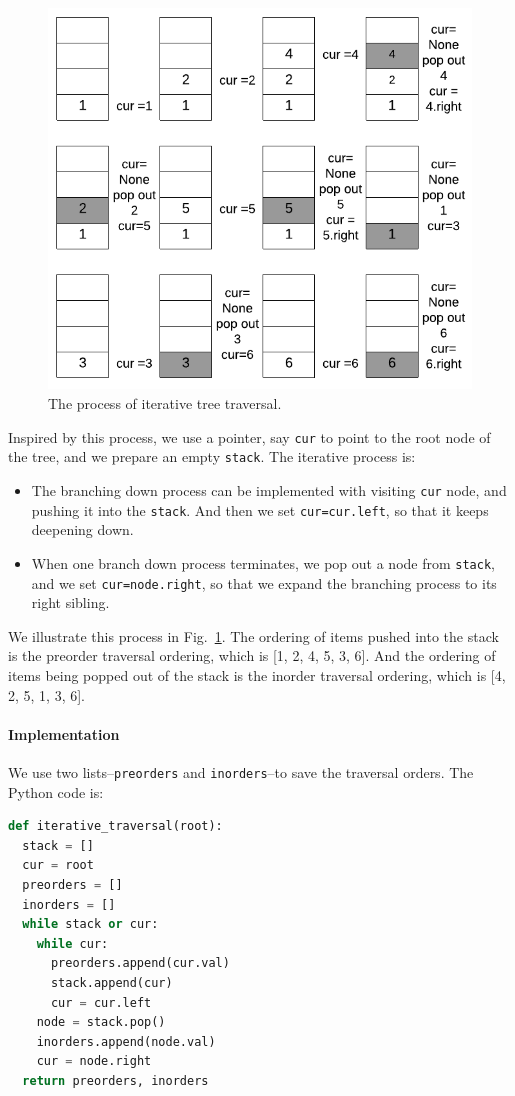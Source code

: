\documentclass[../main.tex]{subfiles}
\begin{document}
\begin{figure}[!ht]
    \centering
    \includegraphics[width = .9\columnwidth]{fig/iterative_tree_traversal.png}
    \caption{The process of iterative tree traversal.}
    \label{fig:iterative_tree_traveral}
\end{figure}

Inspired by this process, we use a pointer, say \texttt{cur} to point to the root node of the tree, and we prepare an empty \texttt{stack}. The iterative process is:
\begin{itemize}
    \item The branching down process can be implemented with visiting  \texttt{cur} node, and pushing it into the \texttt{stack}. And then we set \texttt{cur=cur.left}, so that it keeps deepening down. 
    \item When one branch down process terminates, we pop out a node from \texttt{stack}, and we set \texttt{cur=node.right}, so that we expand the branching process to its right sibling. 
\end{itemize}
We illustrate this process in Fig.~\ref{fig:iterative_tree_traveral}. The ordering of items pushed into the stack is the preorder traversal ordering, which is [1, 2, 4, 5, 3, 6]. And the ordering of items being popped out of the stack is the inorder traversal ordering, which is [4, 2, 5, 1, 3, 6].  

\paragraph{Implementation} We use two lists--\texttt{preorders} and \texttt{inorders}--to save the traversal orders. The Python code is:
\begin{lstlisting}[language=Python]
def iterative_traversal(root):
  stack = []
  cur = root
  preorders = []
  inorders = []
  while stack or cur:
    while cur:
      preorders.append(cur.val)
      stack.append(cur)
      cur = cur.left
    node = stack.pop()
    inorders.append(node.val)
    cur = node.right
  return preorders, inorders
\end{lstlisting}
\end{document}
